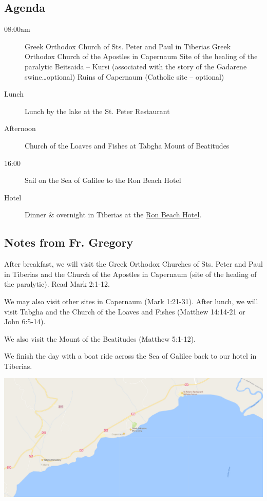 \documentclass[letterpaper]{report}
\begin{document}
\subsection{Agenda}
\begin{description}
	\item[08:00am]  Greek Orthodox Church of Sts. Peter and Paul in Tiberias 
	  \subitem Greek Orthodox Church of the Apostles in Capernaum
	  \subitem Site of the healing of the paralytic
	  \subitem Beitsaida – Kursi
	      (associated with the story of the Gadarene swine…optional)
	  \subitem Ruins of Capernaum (Catholic site – optional) 
	\item[Lunch] Lunch by the lake at the St. Peter Restaurant
	\item[Afternoon] Church of the Loaves and Fishes at Tabgha Mount of 
	     Beatitudes
	\item[16:00] Sail on the Sea of Galilee to the Ron Beach Hotel
	\item[Hotel] Dinner \& overnight in Tiberias at the
	  \href{http://www.ronbeachhotel.com/}{Ron Beach Hotel}.
\end{description}

\subsection{Notes from Fr. Gregory}
After breakfast, we will visit the Greek Orthodox Churches of
Sts. Peter and Paul in Tiberias and the Church of the Apostles in Capernaum
(site of the healing of the paralytic).
Read Mark 2:1-12.

We may also visit other sites in Capernaum (Mark 1:21-31).
After lunch, we will visit Tabgha and the Church of the Loaves and Fishes
(Matthew 14:14-21 or John 6:5-14).

We also visit the Mount of the Beatitudes (Matthew 5:1-12).

We finish the day with a boat ride across the Sea of Galilee back to our hotel 
in Tiberias.

\includegraphics[width=\textwidth]{Capernaum}
\end{document}
